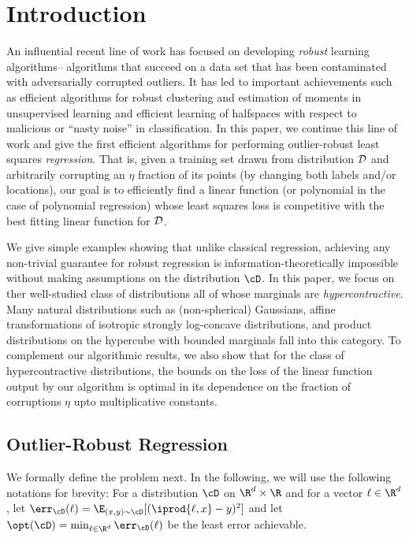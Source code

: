\section{Introduction}

An influential recent line of work has focused on developing {\em robust} learning algorithms--
algorithms that succeed on a data set that has been
contaminated with adversarially corrupted outliers. It has led to important
achievements such as efficient algorithms for robust clustering and estimation of moments \citep{DBLP:journals/corr/LaiRV16,DBLP:journals/corr/DiakonikolasKKL16,DBLP:conf/stoc/CharikarSV17,DBLP:journals/corr/abs-1711-11581,DBLP:journals/corr/abs-1711-07465} in unsupervised learning and efficient learning of halfspaces \citep{DBLP:journals/jmlr/KlivansLS09,DBLP:journals/corr/DiakonikolasKS17} with respect to
malicious or ``nasty noise'' in classification.  In this paper, we continue this line of work and give the first
efficient algorithms for performing outlier-robust least squares {\em regression}.  That is,
given a training set drawn from distribution ${\cal D}$ and arbitrarily corrupting an $\eta$
fraction of its points (by changing both labels and/or locations), our goal is to efficiently find a linear function (or polynomial in
the case of polynomial regression) whose least squares loss is competitive with the
best fitting linear function for ${\cal D}$.

We give simple examples showing that unlike classical regression, achieving any non-trivial guarantee for robust regression is information-theoretically impossible without making assumptions on the distribution $\cD$. In this paper, we focus on ther well-studied class of distributions all of whose marginals are {\em hypercontractive}.  Many natural distributions such as (non-spherical) Gaussians, affine transformations of isotropic strongly log-concave distributions, and product distributions on the hypercube with bounded marginals fall into this category. To complement our algorithmic results, we also show that for the class of hypercontractive distributions, the bounds on the loss of the linear function output by our algorithm is optimal in its dependence on the fraction of corruptions $\eta$ upto multiplicative constants.

\subsection{Outlier-Robust Regression}
We formally define the problem next. In the following, we will use the following notations for brevity: For a distribution $\cD$ on $\R^d \times \R$ and for a vector $\ell \in \R^d$, let $\err_\cD(\ell) = \E_{(x,y) \sim \cD}[ (\iprod{\ell,x} - y)^2]$ and let $\opt(\cD) = \min_{\ell \in \R^d} \err_{\cD}(\ell)$ be the least error achievable. 

